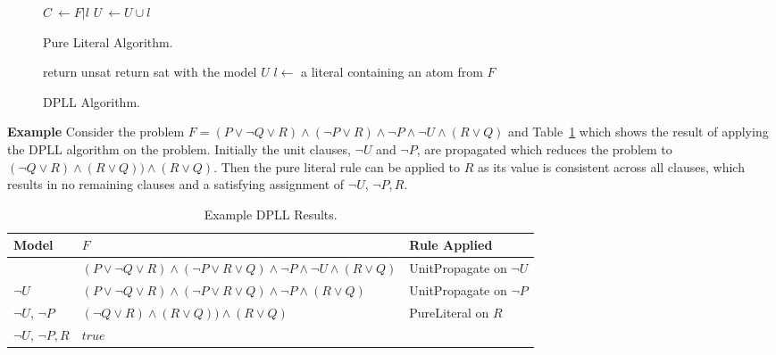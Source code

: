 \documentclass[]{final_report}
\begin{document}
\begin{figure}[t]
\begin{algorithmic}
		\State $C~\gets \mathit{F}|l$
		\State $U~\gets U \cup {l}$
	\EndWhile
\EndFunction    
\end{algorithmic}

\caption{\label{fig:dppl-pure-literal} Pure Literal Algorithm.}
\end{figure}

\begin{figure}[t]
\begin{algorithmic}
	\State {}
		\State return unsat
	\EndIf
	\State {}
		\State return sat with the model $U$
	\EndIf
	\State $l \gets$ a literal containing an atom from $\mathit{F}$
	\State {}
	\State {}
\EndFunction    
\end{algorithmic}
\caption{\label{fig:dppl-classic-algo} DPLL Algorithm.}
\end{figure}

\textbf{Example}
Consider the problem $F = (P \lor \lnot{Q} \lor R) \land (\lnot{P} \lor R) \land \lnot{P} \land \lnot{U} \land (R \lor Q)$ and Table~\ref{table:dpll-results} which shows the result of applying the DPLL algorithm on the problem. Initially the unit clauses, $\lnot{U}$ and $\lnot{P}$, are propagated which reduces the problem to $(\lnot{Q} \lor R) \land (R \lor Q)) \land (R \lor Q)$. Then the pure literal rule can be applied to $R$ as its value is consistent across all clauses, which results in no remaining clauses and a satisfying assignment of $\lnot{U}$, $\lnot{P}, R$.

\begin{table}[t]
\centering
\begin{tabular}{|l|l|l|}
\hline
Model & $F$ & Rule Applied \\ \hline
{} & $(P \lor \lnot{Q} \lor R) \land (\lnot{P} \lor R \lor Q) \land \lnot{P} \land \lnot{U} \land (R \lor Q)$ & UnitPropagate on $\lnot{U}$   \\ \hline
{$\lnot{U}$} & $(P \lor \lnot{Q} \lor R) \land (\lnot{P} \lor R \lor Q) \land \lnot{P} \land (R \lor Q)$ & UnitPropagate on $\lnot{P}$   \\ \hline
{$\lnot{U}$, $\lnot{P}$} & $(\lnot{Q} \lor R) \land (R \lor Q)) \land (R \lor Q)$ & PureLiteral on $R$    \\ \hline
{$\lnot{U}$, $\lnot{P}, R$} & $true$ &     \\ \hline
\end{tabular}
\caption{Example DPLL Results.}
\label{table:dpll-results}
\end{table}
\end{document}

